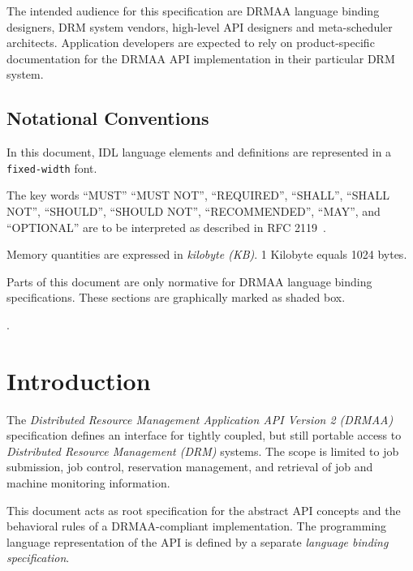 \documentclass{article}
\newcommand{\h}[1]{\lstinline|#1|}
\newcommand{\langbind}[1]{\begin{shaded}#1\end{shaded}}
\newcommand{\rat}[1]{}
\begin{document}
The intended audience for this specification are DRMAA language binding designers, DRM system vendors, high-level API designers and meta-scheduler architects. Application developers are expected to rely on product-specific documentation for the DRMAA API implementation in their particular DRM system.\\


\subsection*{Notational Conventions}
\label{sec:rfc2119}

In this document, IDL language elements and definitions are represented in a \h{fixed-width} font.

The key words \enquote{MUST} \enquote{MUST NOT}, \enquote{REQUIRED}, \enquote{SHALL}, \enquote{SHALL NOT}, \enquote{SHOULD}, \enquote{SHOULD NOT}, \enquote{RECOMMENDED}, \enquote{MAY},  and \enquote{OPTIONAL} are to be interpreted as described in RFC 2119~\cite{rfc2119}.

Memory quantities are expressed in \emph{kilobyte (KB)}. 1 Kilobyte equals 1024 bytes.

\langbind{
Parts of this document are only normative for DRMAA language binding specifications. These sections are graphically marked as shaded box.
}

\rat{The usage of kikibyte as memory quantity unit, as well as the usage of bytes as in JSDL, was rejected by the group (conf call Apr. 13th 2011)}. 

\newpage
\tableofcontents
\newpage

\section{Introduction}
\label{sec:introduction}

 The \emph{Distributed Resource Management Application API Version 2 (DRMAA)} specification defines an interface for tightly coupled, but still portable access to \emph{Distributed Resource Management (DRM)} systems. The scope is limited to job submission, job control, reservation management, and retrieval of job and machine monitoring information. 

This document acts as root specification for the abstract API concepts and the behavioral rules of a DRMAA-compliant implementation. The programming language representation of the API is defined by a separate \emph{language binding specification}.  
\end{document}
